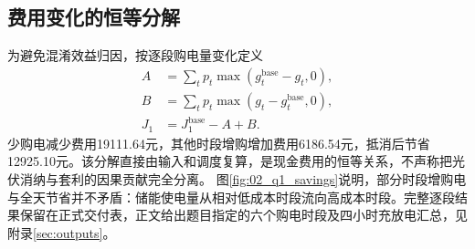 \subsection{费用变化的恒等分解}
为避免混淆效益归因，按逐段购电量变化定义
\begin{align}
A&=\sum_t p_t\max(g_t^{\mathrm{base}}-g_t,0),\\
B&=\sum_t p_t\max(g_t-g_t^{\mathrm{base}},0),\\
J_1&=J_1^{\mathrm{base}}-A+B.
\end{align}
少购电减少费用19111.64元，其他时段增购增加费用6186.54元，抵消后节省12925.10元。该分解直接由输入和调度复算，是现金费用的恒等关系，不声称把光伏消纳与套利的因果贡献完全分离。
图\ref{fig:02_q1_savings}说明，部分时段增购电与全天节省并不矛盾：储能使电量从相对低成本时段流向高成本时段。完整逐段结果保留在正式交付表，正文给出题目指定的六个购电时段及四小时充放电汇总，见附录\ref{sec:outputs}。
\FloatBarrier
